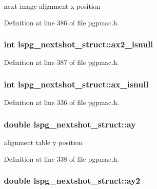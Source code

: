 next image alignment x position 



Definition at line 386 of file pgpmac.\-h.

\hypertarget{structlspg__nextshot__struct_a846845b0b9ecf6517ef85554771ec71d}{
\subsubsection[{ax2\-\_\-isnull}]{\setlength{\rightskip}{0pt plus 5cm}int lspg\-\_\-nextshot\-\_\-struct\-::ax2\-\_\-isnull}}\label{structlspg__nextshot__struct_a846845b0b9ecf6517ef85554771ec71d}


Definition at line 387 of file pgpmac.\-h.

\hypertarget{structlspg__nextshot__struct_aae46c7911b2b218497ad4a68f3dbb7d9}{
\subsubsection[{ax\-\_\-isnull}]{\setlength{\rightskip}{0pt plus 5cm}int lspg\-\_\-nextshot\-\_\-struct\-::ax\-\_\-isnull}}\label{structlspg__nextshot__struct_aae46c7911b2b218497ad4a68f3dbb7d9}


Definition at line 336 of file pgpmac.\-h.

\hypertarget{structlspg__nextshot__struct_a9e20b9a0aeb41f7f7d653a1c60335bf1}{
\subsubsection[{ay}]{\setlength{\rightskip}{0pt plus 5cm}double lspg\-\_\-nextshot\-\_\-struct\-::ay}}\label{structlspg__nextshot__struct_a9e20b9a0aeb41f7f7d653a1c60335bf1}


alignment table y position 



Definition at line 338 of file pgpmac.\-h.

\hypertarget{structlspg__nextshot__struct_ad13759740204b42e379161f98815f3d0}{
\subsubsection[{ay2}]{\setlength{\rightskip}{0pt plus 5cm}double lspg\-\_\-nextshot\-\_\-struct\-::ay2}}\label{structlspg__nextshot__struct_ad13759740204b42e379161f98815f3d0}


